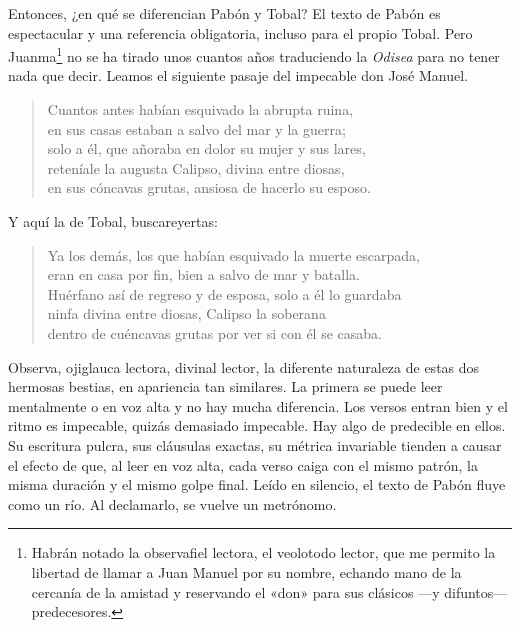 \documentclass[11pt,a4paper]{article}
\begin{document}
Entonces, ¿en qué se diferencian Pabón y Tobal? 
%
El texto de Pabón es espectacular y una referencia obligatoria, incluso para el propio Tobal. Pero Juanma\footnote{Habrán notado la observafiel lectora, el veolotodo lector, que me permito la libertad de llamar a Juan Manuel por su nombre, echando mano de la cercanía de la amistad y reservando el «don» para sus clásicos ---y difuntos--- predecesores.} no se ha tirado unos cuantos años traduciendo la \emph{Odisea} para no tener nada que decir. Leamos el siguiente pasaje del impecable don José Manuel.

\begin{verse}
Cuantos antes habían esquivado la abrupta ruina,\\
en sus casas estaban a salvo del mar y la guerra;\\
solo a él, que añoraba en dolor su mujer y sus lares,\\
reteníale la augusta Calipso, divina entre diosas,\\
en sus cóncavas grutas, ansiosa de hacerlo su esposo. 
\end{verse}

Y aquí la de Tobal, buscareyertas: 

\begin{verse}
Ya los demás, los que habían esquivado la muerte escarpada,\\
eran en casa por fin, bien a salvo de mar y batalla.\\
Huérfano así de regreso y de esposa, solo a él lo guardaba\\
ninfa divina entre diosas, Calipso la soberana\\
dentro de cuéncavas grutas por ver si con él se casaba. 
\end{verse}

Observa, ojiglauca lectora, divinal lector, la diferente naturaleza de estas dos hermosas bestias, en apariencia tan similares. La primera se puede leer mentalmente o en voz alta y no hay mucha diferencia. Los versos entran bien y el ritmo es impecable, quizás demasiado impecable. Hay algo de predecible en ellos. Su escritura pulcra, sus cláusulas exactas, su métrica invariable tienden a causar el efecto de que, al leer en voz alta, cada verso caiga con el mismo patrón, la misma duración y el mismo golpe final. Leído en silencio, el texto de Pabón fluye como un río. Al declamarlo, se vuelve un metrónomo. 
\end{document}
